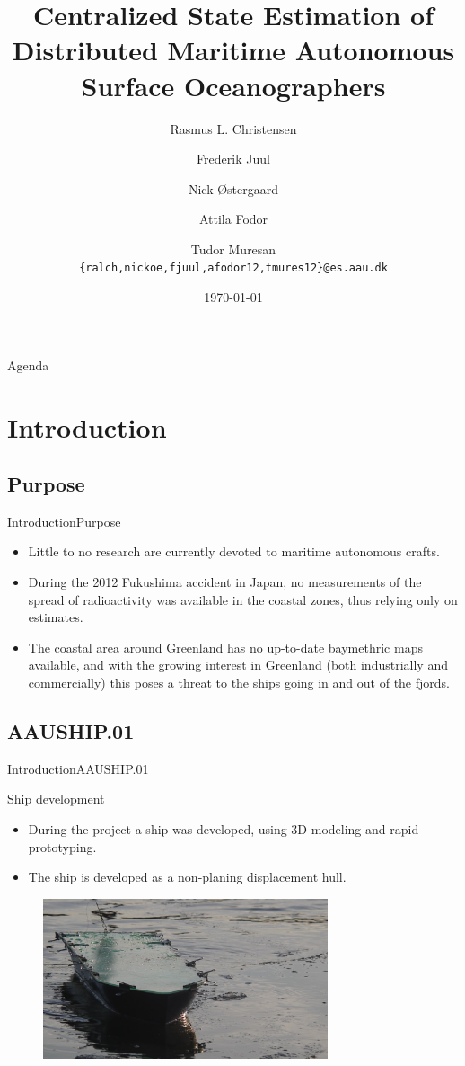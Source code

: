\documentclass[10pt]{beamer}
\title[Centralized State Estimation\\ of Distributed Maritime Autonomous Surface Oceanographers]%
{Centralized State Estimation of Distributed Maritime Autonomous Surface Oceanographers}
\author[Rasmus L. Christensen, Frederik Juul, Nick \O stergaard, Attila Fodor, Tudor Muresan] %
{
  Rasmus L. Christensen \and Frederik Juul \and Nick \O stergaard \and Attila Fodor \and Tudor Muresan\\
  {{\tt \{ralch,nickoe,fjuul,afodor12,tmures12\}@es.aau.dk}}
}
\institute[
  Dept.\ of Electronic Systems,\\
  Aalborg University,\\
  Denmark
] %
{%
  Department of Electronic Systems,\\
  Aalborg University,\\
  Denmark
  
}
\date{\today}
\begin{document}
\begin{frame}[plain] %
  \titlepage
\end{frame}

\begin{frame}{Agenda}{}
\tableofcontents
\end{frame}
\section{Introduction}
\subsection{Purpose}
\begin{frame}{Introduction}{Purpose}
  \begin{itemize}
  	\item<1-> Little to no research are currently devoted to maritime autonomous crafts.
    \item<2-> During the 2012 Fukushima accident in Japan, no measurements of the spread of radioactivity was available in the coastal zones, thus relying only on estimates. 
    \item<3-> The coastal area around Greenland has no up-to-date baymethric maps available, and with the growing interest in Greenland (both industrially and commercially) this poses a threat to the ships going in and out of the fjords.
  \end{itemize}
\end{frame}

\subsection{AAUSHIP.01}
\begin{frame}{Introduction}{AAUSHIP.01}
  \begin{block}{Ship development}
  \begin{itemize}
  	\item During the project a ship was developed, using 3D modeling and rapid prototyping.
  	\item The ship is developed as a non-planing displacement hull.
  	\end{itemize}
  \end{block}
  \begin{figure}
			\begin{center}
				\includegraphics[width=8.4cm]{img/aauship}
				\label{fig:aauship}
			\end{center}
		\end{figure}
\end{frame}
\end{document}
